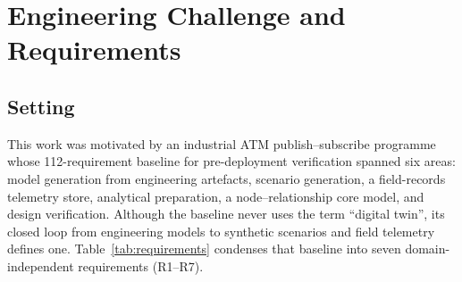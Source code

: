 \section{Engineering Challenge and Requirements}
\label{sec:requirements}

\subsection{Setting}

This work was motivated by an industrial ATM publish--subscribe programme whose 112-requirement baseline for pre-deployment verification spanned six areas: model generation from engineering artefacts, scenario generation, a field-records telemetry store, analytical preparation, a node--relationship core model, and design verification. Although the baseline never uses the term ``digital twin'', its closed loop from engineering models to synthetic scenarios and field telemetry defines one. Table~\ref{tab:requirements} condenses that baseline into seven domain-independent requirements (R1--R7).

